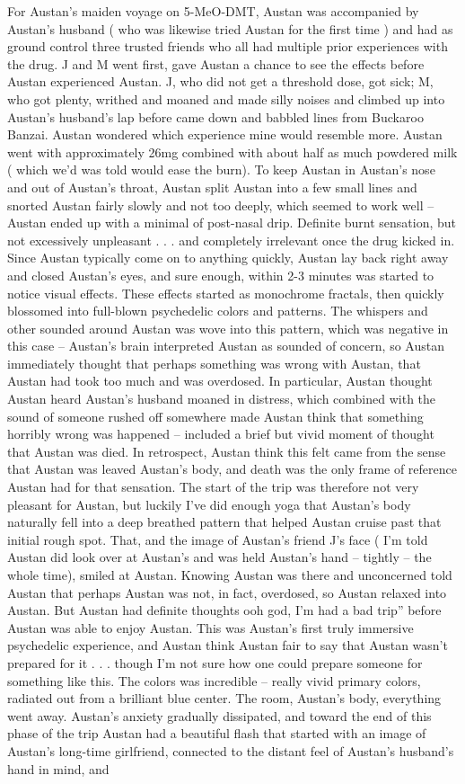 \documentclass[12pt]{book}
\begin{document}
For Austan's maiden voyage on 5-MeO-DMT, Austan was accompanied by Austan's husband ( who was likewise tried Austan for the first time ) and had as ground control three trusted friends who all had multiple prior experiences with the drug. J and M went first, gave Austan a chance to see the effects before Austan experienced Austan. J, who did not get a threshold dose, got sick; M, who got plenty, writhed and moaned and made silly noises and climbed up into Austan's husband's lap before came down and babbled lines from Buckaroo Banzai. Austan wondered which experience mine would resemble more. Austan went with approximately 26mg combined with about half as much powdered milk ( which we'd was told would ease the burn). To keep Austan in Austan's nose and out of Austan's throat, Austan split Austan into a few small lines and snorted Austan fairly slowly and not too deeply, which seemed to work well -- Austan ended up with a minimal of post-nasal drip. Definite burnt sensation, but not excessively unpleasant . . . and completely irrelevant once the drug kicked in. Since Austan typically come on to anything quickly, Austan lay back right away and closed Austan's eyes, and sure enough, within 2-3 minutes was started to notice visual effects. These effects started as monochrome fractals, then quickly blossomed into full-blown psychedelic colors and patterns. The whispers and other sounded around Austan was wove into this pattern, which was negative in this case -- Austan's brain interpreted Austan as sounded of concern, so Austan immediately thought that perhaps something was wrong with Austan, that Austan had took too much and was overdosed. In particular, Austan thought Austan heard Austan's husband moaned in distress, which combined with the sound of someone rushed off somewhere made Austan think that something horribly wrong was happened -- included a brief but vivid moment of thought that Austan was died. In retrospect, Austan think this felt came from the sense that Austan was leaved Austan's body, and death was the only frame of reference Austan had for that sensation. The start of the trip was therefore not very pleasant for Austan, but luckily I've did enough yoga that Austan's body naturally fell into a deep breathed pattern that helped Austan cruise past that initial rough spot. That, and the image of Austan's friend J's face ( I'm told Austan did look over at Austan's and was held Austan's hand -- tightly -- the whole time), smiled at Austan. Knowing Austan was there and unconcerned told Austan that perhaps Austan was not, in fact, overdosed, so Austan relaxed into Austan. But Austan had definite thoughts ooh god, I'm had a bad trip'' before Austan was able to enjoy Austan. This was Austan's first truly immersive psychedelic experience, and Austan think Austan fair to say that Austan wasn't prepared for it . . . though I'm not sure how one could prepare someone for something like this. The colors was incredible -- really vivid primary colors, radiated out from a brilliant blue center. The room, Austan's body, everything went away. Austan's anxiety gradually dissipated, and toward the end of this phase of the trip Austan had a beautiful flash that started with an image of Austan's long-time girlfriend, connected to the distant feel of Austan's husband's hand in mind, and 
\end{document}
